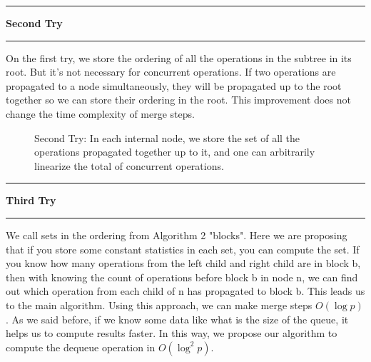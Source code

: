 \documentclass[10pt,table]{article}
\newcommand\question[1]{\vspace{1.2em}\hrule\textbf{ #1}\vspace{.5em}\hrule}
\theoremstyle{definition}
\begin{document}
\question{Second Try}

On the first try, we store the ordering of all the operations in the subtree in its root. But it's not necessary for concurrent operations. If two operations are propagated to a node simultaneously, they will be propagated up to the root together so we can store their ordering in the root. This improvement does not change the time complexity of merge steps.

\begin{figure}[h]
\begin{center}
\caption{Second Try: In each internal node, we store the set of all the operations propagated together up to it, and one can arbitrarily linearize the total of concurrent operations.}
\end{center}
\end{figure}

\pagebreak
\question{Third Try}

We call sets in the ordering from Algorithm 2 "blocks". Here we are proposing that if you store some constant statistics in each set, you can compute the set. If you know how many operations from the left child and right child are in block b, then with knowing the count of operations before block b in node n, we can find out which operation from each child of n has propagated to block b. This leads us to the main algorithm. Using this approach, we can make merge steps $O(\log p)$. As we said before, if we know some data like what is the size of the queue, it helps us to compute results faster. In this way, we propose our algorithm to compute the dequeue operation in $O(\log^2p)$. 
\end{document}
